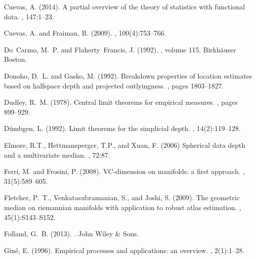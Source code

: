 \documentclass[a4paper]{article}
\numberwithin{equation}{section}
\begin{document}
\begin{thebibliography}{99}
Cuevas, A. (2014).
\newblock A partial overview of the theory of statistics with functional data.
, 147:1--23. 

Cuevas, A. and Fraiman, R. (2009).
, 100(4):753--766.

Do~Carmo, M.~P. and Flaherty~Francis, J. (1992).
, volume 115.
\newblock Birkh{\"a}user Boston.

Donoho, D.~L. and Gasko, M. (1992).
\newblock Breakdown properties of location estimates based on halfspace depth
  and projected outlyingness.
, pages 1803--1827.

Dudley, R.~M. (1978).
\newblock Central limit theorems for empirical measures.
, pages 899--929.

D{\"u}mbgen, L. (1992).
\newblock Limit theorems for the simplicial depth.
, 14(2):119--128.


Elmore, R.T., Hettmansperger, T.P., and  Xuan, F. (2006)
\newblock Spherical data depth and a multivariate median.
, 72:87.

Ferri, M. and Frosini, P. (2008).
\newblock VC-dimension on manifolds: a first approach.
, 31(5):589--605.


Fletcher, P.~T., Venkatasubramanian, S., and Joshi, S. (2009).
\newblock The geometric median on riemannian manifolds with application to
  robust atlas estimation.
, 45(1):S143--S152.

Folland, G.~B. (2013).
.
\newblock John Wiley \& Sons.

Gin{\'e}, E. (1996).
\newblock Empirical processes and applications: an overview.
, 2(1):1--28.




\end{thebibliography}
\end{document}
